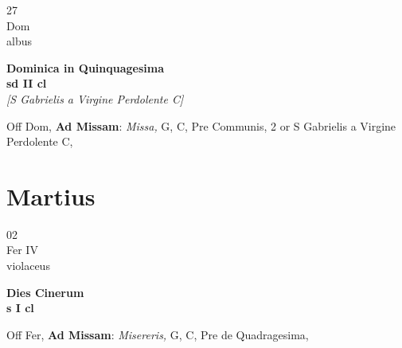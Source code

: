\documentclass[10pt, openany]{book}
\begin{document}
        \begin{center}
            \begin{minipage}{3.5in}
                \vspace{2em}
                \begin{minipage}{0.5in}
                    {\Huge 27} \\
                    {\normalsize Dom} \\
                    {\normalsize albus}
                \end{minipage}
                \begin{minipage}{3.0in}
                    \textbf{ \large Dominica in Quinquagesima \\
                    \textnormal{\normalsize sd II cl}} \\ \textit{[S Gabrielis a Virgine Perdolente C]} \\ 
                \end{minipage}
                \begin{justify}Off Dom, \textbf{Ad Missam}: \textit{Missa,} G, C, Pre Communis, 2 or S Gabrielis a Virgine Perdolente C,   
                \end{justify}
            \end{minipage}
        \end{center}
    
        \chapter{Martius}
                        
        \begin{center}
            \begin{minipage}{3.5in}
                \vspace{2em}
                \begin{minipage}{0.5in}
                    {\Huge 02} \\
                    {\normalsize Fer IV} \\
                    {\normalsize violaceus}
                \end{minipage}
                \begin{minipage}{3.0in}
                    \textbf{ \large Dies Cinerum \\
                    \textnormal{\normalsize s I cl}} \\ 
                \end{minipage}
                \begin{justify}Off Fer, \textbf{Ad Missam}: \textit{Misereris,} G, C, Pre de Quadragesima,   
                \end{justify}
            \end{minipage}
        \end{center}
    
\end{document}
